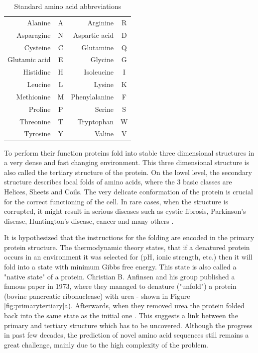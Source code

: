 \begin{table}
    \centering
    \begin{tabular}{r|c|r|c|}
        Alanine & A & Arginine & R \\
        Asparagine & N & Aspartic acid & D \\
        Cysteine & C & Glutamine & Q \\
        Glutamic acid & E & Glycine & G \\
        Histidine & H & Isoleucine & I \\
        Leucine & L & Lysine & K \\
        Methionine & M & Phenylalanine & F \\
        Proline & P & Serine & S \\
        Threonine & T & Tryptophan & W \\
        Tyrosine & Y & Valine & V
    \end{tabular}
    \caption{Standard amino acid abbreviations}
    \label{tab:aa_codes}
\end{table}

To perform their function proteins fold into stable three dimensional structures in a very dense and fast changing environment.
This three dimensional structure is also called the tertiary structure of the protein. 
On the lowel level, the secondary structure describes local folds of amino acids, where the 3 basic classes are Helices, Sheets and Coils.
The very delicate conformation of the protein is crucial for the correct functioning of the cell.
In rare cases, when the structure is corrupted, it might result in serious diseases such as cystic fibrosis, Parkinson's disease, Huntington's disease, cancer and many others \cite{protein_misfolding_diseases}.

It is hypothesized that the instructions for the folding are encoded in the primary protein structure. 
The thermodynamic theory states, that if a denatured protein occurs in an environment it was selected for (pH, ionic strength, etc.) then it will fold into a state with minimum Gibbs free energy.
This state is also called a "native state" of a protein. 
Christian B. Anfinsen and his group published a famous paper in 1973, where they managed to denature ("unfold") a protein (bovine pancreatic ribonuclease) with urea - shown in Figure \ref{fig:primarytertiary}a). 
Afterwards, when they removed urea the protein folded back into the same state as the initial one \cite{anfinsen}. This suggests a link between the primary and tertiary structure which has to be uncovered. Although the progress in past few decades, the prediction of novel amino acid sequences still remains a great challenge, mainly due to the high complexity of the problem.%
    
